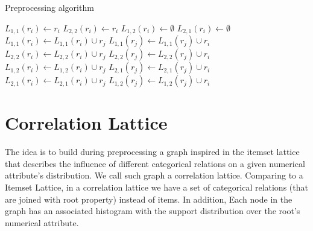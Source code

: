 \begin{algorithm}[h!]
  \caption{Preprocessing algorithm}
  \label{alg3}

     {
      $L_{1,1}(r_i) \leftarrow r_i$ \;
      $L_{2,2}(r_i) \leftarrow r_i$ \;
      $L_{1,2}(r_i) \leftarrow \emptyset$ \;
      $L_{2,1}(r_i) \leftarrow \emptyset$ \;
    }
     {
	 {
	     {
		 {
		    $L_{1,1}(r_i) \leftarrow L_{1,1}(r_i) \cup r_j$ \;
		    $L_{1,1}(r_j) \leftarrow L_{1,1}(r_j) \cup r_i$ \;
		}
		 {
		    $L_{2,2}(r_i) \leftarrow L_{2,2}(r_i) \cup r_j$ \;
		    $L_{2,2}(r_j) \leftarrow L_{2,2}(r_j) \cup r_i$ \;
		}
	    }
	     {
		$L_{1,2}(r_i) \leftarrow L_{1,2}(r_i) \cup r_j$ \;
		$L_{2,1}(r_j) \leftarrow L_{2,1}(r_j) \cup r_i$ \;
	    }
	     {
		$L_{2,1}(r_i) \leftarrow L_{2,1}(r_i) \cup r_j$ \;
		$L_{1,2}(r_j) \leftarrow L_{1,2}(r_j) \cup r_i$ \;
	    }
	}
   }
\end{algorithm}

\subsection{}

\section{Correlation Lattice}
\label{ch:lattice}

The idea is to build during preprocessing a graph inspired in the itemset lattice that describes the influence of
different categorical relations on a given numerical attribute's distribution. We call such graph a correlation
lattice.
Comparing to a Itemset Lattice, in a correlation lattice we have a set of categorical relations (that are joined with
root property) instead of items. In addition, Each node in the graph has an associated histogram with the support
distribution over the root's numerical attribute.


